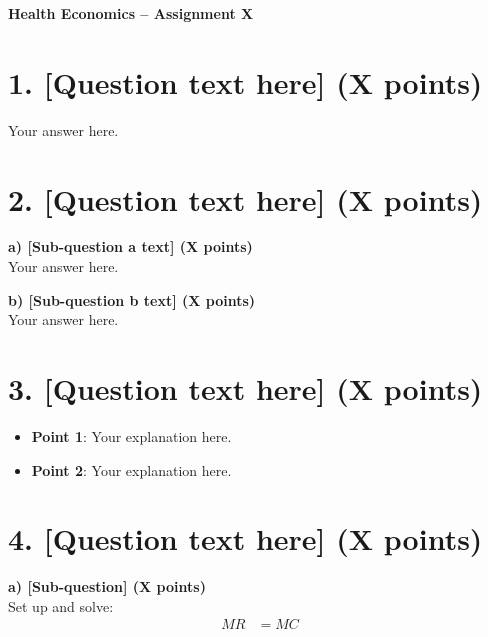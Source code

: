 \documentclass[11pt, letterpaper]{article}
\newcommand{\AssignmentNumber}{X}          %
\begin{document}
\begin{center}
    \LARGE\bfseries Health Economics -- Assignment \AssignmentNumber
\end{center}
\vspace{1em}


\section*{1. [Question text here] (X points)}

Your answer here.

\section*{2. [Question text here] (X points)}

\textbf{a) [Sub-question a text] (X points)} \\
Your answer here.

\textbf{b) [Sub-question b text] (X points)} \\
Your answer here.

\section*{3. [Question text here] (X points)}

\begin{itemize}[leftmargin=*]
    \item \textbf{Point 1}: Your explanation here.
    \item \textbf{Point 2}: Your explanation here.
\end{itemize}

\section*{4. [Question text here] (X points)}

\textbf{a) [Sub-question] (X points)} \\
Set up and solve:
\begin{align*}
    MR &= MC \\
\end{align*}
\end{document}
